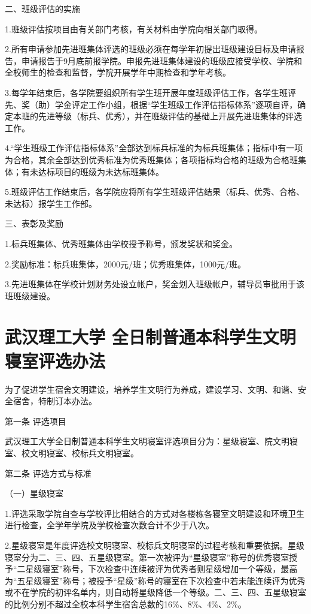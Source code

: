 \documentclass[UTF8,12pt,a4paper]{report}
\begin{document}
二、班级评估的实施

1.班级评估按项目由有关部门考核，有关材料由学院向相关部门取得。

2.所有申请参加先进班集体评选的班级必须在每学年初提出班级建设目标及申请报告，申请报告于9月底前报学院。申报先进班集体建设的班级应接受学校、学院和全校师生的检查和监督，学院开展学年中期检查和学年考核。

3.每学年结束后，各学院要组织所有学生班开展年度班级评估工作，各学生班评先、奖（助）学金评定工作小组，根据“学生班级工作评估指标体系”逐项自评，确定本班的先进等级（标兵、优秀），并在班级评估的基础上开展先进班集体的评选工作。

4.“学生班级工作评估指标体系”全部达到标兵标准的为标兵班集体；指标中有一项为合格，其余全部达到优秀标准为优秀班集体；各项指标均合格的班级为合格班集体；有未达标项目的班级为未达标班集体。

5.班级评估工作结束后，各学院应将所有学生班级评估结果（标兵、优秀、合格、未达标）报学生工作部。

三、表彰及奖励

1.标兵班集体、优秀班集体由学校授予称号，颁发奖状和奖金。

2.奖励标准：标兵班集体，2000元/班；优秀班集体，1000元/班。

3.先进班集体在学校计划财务处设立帐户，奖金划入班级帐户，辅导员审批用于该班班级建设。
\chapter{武汉理工大学 全日制普通本科学生文明寝室评选办法}
为了促进学生宿舍文明建设，培养学生文明行为养成，建设学习、文明、和谐、安全宿舍，特制订本办法。

第一条 评选项目

武汉理工大学全日制普通本科学生文明寝室评选项目分为：星级寝室、院文明寝室、校文明寝室、校标兵文明寝室。

第二条 评选方式与标准

（一）星级寝室

1.评选采取学院自查与学校评比相结合的方式对各楼栋各寝室文明建设和环境卫生进行检查，全学年学院及学校检查次数合计不少于八次。

2.星级寝室是年度评选校文明寝室、校标兵文明寝室的过程考核和重要依据。星级寝室分为二、三、四、五星级寝室。第一次被评为“星级寝室”称号的优秀寝室授予“二星级寝室”称号，下次检查中连续被评为优秀者则星级增加一个等级，最高为“五星级寝室”称号；被授予“星级”称号的寝室在下次检查中若未能连续评为优秀或不在学院的初评名单内，则自动将星级降低一个等级。二、三、四、五星级寝室的比例分别不超过全校本科学生宿舍总数的16\%、8\%、4\%、2\%。
\end{document}
